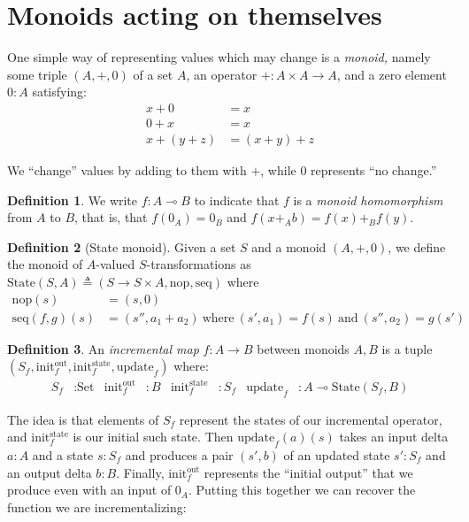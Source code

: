\documentclass{article}
\theoremstyle{definition}
\newtheorem{definition}{Definition}
\theoremstyle{remark}
\newcommand\defeq\triangleq
\newcommand\<\;                 %
\newcommand\init{\text{init}}
\newcommand\update{\text{update}}
\newcommand\Set{\text{Set}}
\newcommand\State{\text{State}}
\newcommand\lto\multimap
\begin{document}
\section{Monoids acting on themselves}

One simple way of representing values which may change is a \emph{monoid,} namely some triple $(A,+,0)$ of a set $A$, an operator ${+} : A \times A \to A$, and a zero element $0 : A$ satisfying:
%
\begin{align*}
  x + 0 &= x\\
  0 + x &= x\\
  x + (y + z) &= (x + y) + z
\end{align*}

\noindent
We ``change'' values by adding to them with $+$, while $0$ represents ``no change.''

\begin{definition}
  We write $f : A \lto B$ to indicate that $f$ is a \emph{monoid homomorphism} from $A$ to $B$, that is, that $f(0_A) = 0_B$ and $f(x +_A b) = f(x) +_B f(y)$.
\end{definition}

\begin{definition}[State monoid]
  Given a set $S$ and a monoid $(A,+,0)$, we define the monoid of $A$-valued $S$-transformations as $\State(S,A) \defeq (S \to S \times A, \text{nop}, \text{seq})$ where
%
  \begin{align*}
    \text{nop}(s) &= (s, 0)\\
    \text{seq}(f,g)(s) &= (s'', a_1 + a_2)
    ~\text{where}~ (s', a_1) = f(s) ~\text{and}~ (s'', a_2) = g(s')
  \end{align*}
\end{definition}

\newcommand\initout{\init^{\text{out}}}
\newcommand\initstate{\init^{\text{state}}}

\begin{definition}
  An \emph{incremental map} $f : A \to B$ between monoids $A, B$ is a tuple $(S_f, \initout_f, \initstate_f, \update_f)$ where:
  \begin{align*}
    S_f &: \Set
    &
    \initout_f &: B
    &
    \initstate_f &: S_f
    &
    \update_f &: A \lto \State({S_f}, B)
  \end{align*}
\end{definition}

\noindent
The idea is that elements of $S_f$ represent the states of our incremental operator, and $\initstate_f$ is our initial such state.
Then $\update_f(a)(s)$ takes an input delta $a : A$ and a state $s : S_f$ and produces a pair $(s', b)$ of an updated state $s' : S_f$ and an output delta $b : B$.
Finally, $\initout_f$ represents the ``initial output'' that we produce even with an input of $0_A$.
Putting this together we can recover the function we are incrementalizing:
\end{document}
